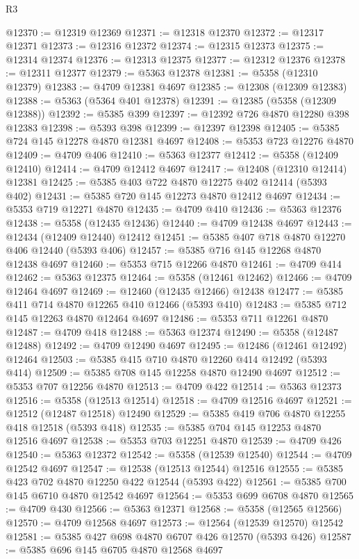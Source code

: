 \begin{lexlean}{R3}
\begin{coremodule}
@12370 := @12319 @12369
@12371 := @12318 @12370
@12372 := @12317 @12371
@12373 := @12316 @12372
@12374 := @12315 @12373
@12375 := @12314 @12374
@12376 := @12313 @12375
@12377 := @12312 @12376
@12378 := @12311 @12377
@12379 := @5363 @12378
@12381 := @5358 (@12310 @12379)
@12383 := @4709 @12381 @4697
@12385 := @12308 (@12309 @12383)
@12388 := @5363 (@5364 @401 @12378)
@12391 := @12385 (@5358 (@12309 @12388))
@12392 := @5385 @399
@12397 := @12392 @726 @4870 @12280 @398 @12383
@12398 := @5393 @398
@12399 := @12397 @12398
@12405 := @5385 @724 @145 @12278 @4870 @12381 @4697
@12408 := @5353 @723 @12276 @4870
@12409 := @4709 @406
@12410 := @5363 @12377
@12412 := @5358 (@12409 @12410)
@12414 := @4709 @12412 @4697
@12417 := @12408 (@12310 @12414) @12381
@12425 := @5385 @403 @722 @4870 @12275 @402 @12414 (@5393 @402)
@12431 := @5385 @720 @145 @12273 @4870 @12412 @4697
@12434 := @5353 @719 @12271 @4870
@12435 := @4709 @410
@12436 := @5363 @12376
@12438 := @5358 (@12435 @12436)
@12440 := @4709 @12438 @4697
@12443 := @12434 (@12409 @12440) @12412
@12451 := @5385 @407 @718 @4870 @12270 @406 @12440 (@5393 @406)
@12457 := @5385 @716 @145 @12268 @4870 @12438 @4697
@12460 := @5353 @715 @12266 @4870
@12461 := @4709 @414
@12462 := @5363 @12375
@12464 := @5358 (@12461 @12462)
@12466 := @4709 @12464 @4697
@12469 := @12460 (@12435 @12466) @12438
@12477 := @5385 @411 @714 @4870 @12265 @410 @12466 (@5393 @410)
@12483 := @5385 @712 @145 @12263 @4870 @12464 @4697
@12486 := @5353 @711 @12261 @4870
@12487 := @4709 @418
@12488 := @5363 @12374
@12490 := @5358 (@12487 @12488)
@12492 := @4709 @12490 @4697
@12495 := @12486 (@12461 @12492) @12464
@12503 := @5385 @415 @710 @4870 @12260 @414 @12492 (@5393 @414)
@12509 := @5385 @708 @145 @12258 @4870 @12490 @4697
@12512 := @5353 @707 @12256 @4870
@12513 := @4709 @422
@12514 := @5363 @12373
@12516 := @5358 (@12513 @12514)
@12518 := @4709 @12516 @4697
@12521 := @12512 (@12487 @12518) @12490
@12529 := @5385 @419 @706 @4870 @12255 @418 @12518 (@5393 @418)
@12535 := @5385 @704 @145 @12253 @4870 @12516 @4697
@12538 := @5353 @703 @12251 @4870
@12539 := @4709 @426
@12540 := @5363 @12372
@12542 := @5358 (@12539 @12540)
@12544 := @4709 @12542 @4697
@12547 := @12538 (@12513 @12544) @12516
@12555 := @5385 @423 @702 @4870 @12250 @422 @12544 (@5393 @422)
@12561 := @5385 @700 @145 @6710 @4870 @12542 @4697
@12564 := @5353 @699 @6708 @4870
@12565 := @4709 @430
@12566 := @5363 @12371
@12568 := @5358 (@12565 @12566)
@12570 := @4709 @12568 @4697
@12573 := @12564 (@12539 @12570) @12542
@12581 := @5385 @427 @698 @4870 @6707 @426 @12570 (@5393 @426)
@12587 := @5385 @696 @145 @6705 @4870 @12568 @4697

\end{coremodule}
\end{lexlean}
